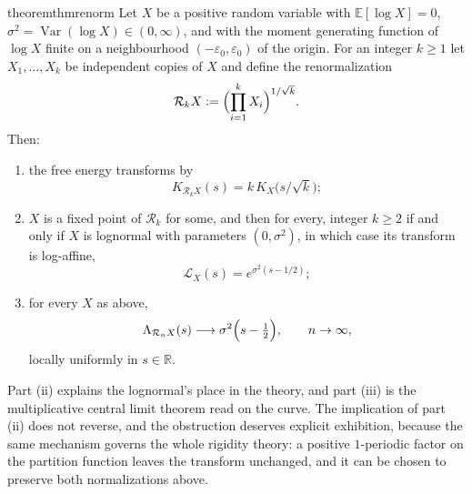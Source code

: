 \documentclass[sn-mathphys-num]{sn-jnl}
\theoremstyle{thmstyleone}%
\theoremstyle{thmstyletwo}%
\theoremstyle{thmstylethree}%
\theoremstyle{thmstyleone}%
\providecommand{\R}{\mathbb{R}}
\providecommand{\E}{\mathbb{E}}
\providecommand{\Var}{\operatorname{Var}}
\providecommand{\Leh}{\mathscr{L}}
\providecommand{\eqdef}{\mathrel{\vcentcolon=}}
\begin{document}
	\begin{restatable}{theorem}{thmrenorm}\label{thm:renorm}
		Let $X$ be a positive random variable with $\E[\log X]=0$,
		$\sigma^2=\Var(\log X)\in(0,\infty)$, and with the moment
		generating function of $\log X$ finite on a neighbourhood
		$(-\varepsilon_0,\varepsilon_0)$ of the origin. For an integer $k\ge1$ let
		$X_1,\dots,X_k$ be independent copies of $X$ and define the
		renormalization
		\begin{equation}\label{eq:renormdef}
			\mathcal R_kX\eqdef\Bigl(\prod_{i=1}^{k}X_i\Bigr)^{1/\sqrt k} .
		\end{equation}
		Then:
		\begin{enumerate}[label=\textup{(\roman*)},leftmargin=2.2em]
			\item the free energy transforms by
			\begin{equation}\label{eq:renormK}
				K_{\mathcal R_kX}(s)=k\,K_X\bigl(s/\sqrt k\bigr) ;
			\end{equation}
			\item $X$ is a fixed point of $\mathcal R_k$ for some, and then
			for every, integer $k\ge2$ if and only if $X$ is lognormal with
			parameters $(0,\sigma^2)$, in which case its transform is
			log-affine,
			\begin{equation}\label{eq:logaffine}
				\Leh_X(s)=e^{\sigma^2(s-1/2)} ;
			\end{equation}
			\item for every $X$ as above,
			\begin{equation}\label{eq:multclt}
				\Lambda_{\mathcal R_nX}(s)\longrightarrow
				\sigma^2\Bigl(s-\tfrac12\Bigr),
				\qquad n\to\infty,
			\end{equation}
			locally uniformly in $s\in\R$.
		\end{enumerate}
	\end{restatable}
	
	Part (ii) explains the lognormal's place in the theory, and part
	(iii) is the multiplicative central limit theorem read on the curve.
	The implication of part (ii) does not reverse, and the obstruction
	deserves explicit exhibition, because the same mechanism governs
	the whole rigidity theory: a positive $1$-periodic factor on the
	partition function leaves the transform unchanged, and it can be
	chosen to preserve both normalizations above.
	
\end{document}
